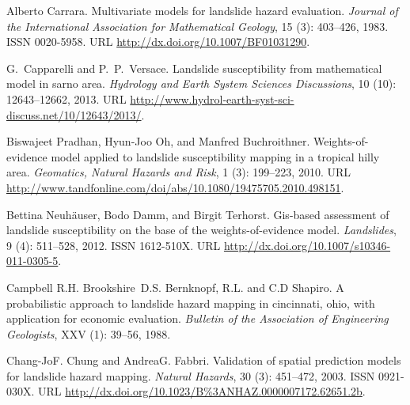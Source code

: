 \documentclass[11pt,twoside]{rmta2010esp}%
\begin{document}
\begin{thebibliography}{99}
Alberto Carrara.
\newblock Multivariate models for landslide hazard evaluation.
\newblock \emph{Journal of the International Association for Mathematical
  Geology}, 15 (3): 403--426, 1983.
\newblock ISSN 0020-5958.
\newblock URL \url{http://dx.doi.org/10.1007/BF01031290}.


G.~Capparelli and P.~P.~Versace.
\newblock Landslide susceptibility from mathematical model in sarno area.
\newblock \emph{Hydrology and Earth System Sciences Discussions}, 10
  (10): 12643--12662, 2013.
\newblock URL
  \url{http://www.hydrol-earth-syst-sci-discuss.net/10/12643/2013/}.


Biswajeet Pradhan, Hyun-Joo Oh, and Manfred Buchroithner.
\newblock Weights-of-evidence model applied to landslide susceptibility mapping
  in a tropical hilly area.
\newblock \emph{Geomatics, Natural Hazards and Risk}, 1 (3):
  199--223, 2010.
\newblock URL
  \url{http://www.tandfonline.com/doi/abs/10.1080/19475705.2010.498151}.
  
  
Bettina Neuhäuser, Bodo Damm, and Birgit Terhorst.
\newblock Gis-based assessment of landslide susceptibility on the base of the
  weights-of-evidence model.
\newblock \emph{Landslides}, 9 (4): 511--528, 2012.
\newblock ISSN 1612-510X.
\newblock URL \url{http://dx.doi.org/10.1007/s10346-011-0305-5}.



Campbell R.H. Brookshire~D.S. Bernknopf, R.L. and C.D Shapiro.
\newblock A probabilistic approach to landslide hazard mapping in cincinnati,
  ohio, with application for economic evaluation.
\newblock \emph{Bulletin of the Association of Engineering Geologists},
  XXV (1): 39--56, 1988.
  
  
Chang-JoF. Chung and AndreaG. Fabbri.
\newblock Validation of spatial prediction models for landslide hazard mapping.
\newblock \emph{Natural Hazards}, 30 (3): 451--472, 2003.
\newblock ISSN 0921-030X.
\newblock URL \url{http://dx.doi.org/10.1023/B\%3ANHAZ.0000007172.62651.2b}.  


\end{thebibliography}
\end{document}
